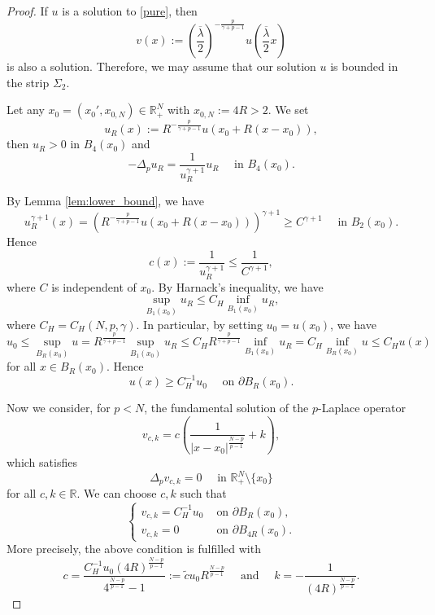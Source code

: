 \documentclass[reqno]{amsart}
\theoremstyle{plain}
\theoremstyle{definition}
\theoremstyle{remark}
\begin{document}
	\begin{proof}	
		If $u$ is a solution to \eqref{pure}, then
		\begin{equation}\label{v}
			v(x) := \left(\frac{\overline\lambda}{2}\right)^{-\frac{p}{\gamma+p-1}} u\left(\frac{\overline\lambda}{2}x\right)
		\end{equation}
		is also a solution. Therefore, we may assume that our solution $u$ is bounded in the strip $\Sigma_2$.
		
		Let any $x_0 = (x_0', x_{0,N}) \in \mathbb{R}^N_+$ with $x_{0,N}:=4R>2$. We set
		\[
		u_R(x) := R^{-\frac{p}{\gamma+p-1}} u(x_0+R(x-x_0)),
		\]
		then $u_R>0$ in $B_4(x_0)$ and
		\[
		-\Delta_p u_R = \frac{1}{u_R^{\gamma+1}} u_R \quad\text{ in } B_4(x_0).
		\]
		
		By Lemma \ref{lem:lower_bound}, we have
		\[
		u_R^{\gamma+1}(x) = \left(R^{-\frac{p}{\gamma+p-1}} u(x_0+R(x-x_0))\right)^{\gamma+1} \ge C^{\gamma+1} \quad\text{ in } B_2(x_0).
		\]
		Hence
		\[
		c(x) := \frac{1}{u_R^{\gamma+1}} \le \frac{1}{C^{\gamma+1}},
		\]
		where $C$ is independent of $x_0$.		
		By Harnack's inequality, we have
		\[
		\sup_{B_1(x_0)} u_R \le C_H \inf_{B_1(x_0)} u_R,
		\]
		where $C_H=C_H(N,p,\gamma)$. In particular, by setting $u_0=u(x_0)$, we have
		\[
		u_0 \le \sup_{B_R(x_0)} u = R^{\frac{p}{\gamma+p-1}} \sup_{B_1(x_0)} u_R \le C_H R^{\frac{p}{\gamma+p-1}} \inf_{B_1(x_0)} u_R = C_H \inf_{B_R(x_0)} u \le C_H u(x)
		\]
		for all $x\in B_R(x_0)$. Hence
		\[
		u(x) \ge C_H^{-1} u_0 \quad\text{ on } \partial B_R(x_0).
		\]
		
		Now we consider, for $p<N$, the fundamental solution of the $p$-Laplace operator
		\[
		v_{c,k} = c\left(\frac{1}{|x-x_0|^\frac{N-p}{p-1}}+k\right),
		\]
		which satisfies
		\[
		\Delta_p v_{c,k} = 0 \quad\text{ in } \mathbb{R}^N_+\setminus\{x_0\}
		\]
		for all $c,k\in\mathbb{R}$. We can choose $c,k$ such that
		\[
		\begin{cases}
			v_{c,k} = C_H^{-1} u_0 & \text{ on }  \partial B_R(x_0),\\
			v_{c,k} = 0 & \text{ on }  \partial B_{4R}(x_0).
		\end{cases}
		\]
		More precisely, the above condition is fulfilled with
		\[
		c=\frac{C_H^{-1}u_0(4R)^\frac{N-p}{p-1}}{4^\frac{N-p}{p-1}-1} := \tilde{c}u_0R^\frac{N-p}{p-1} \quad\text{ and }\quad k=-\frac{1}{(4R)^\frac{N-p}{p-1}}.
		\]
		

\end{proof}
\end{document}
